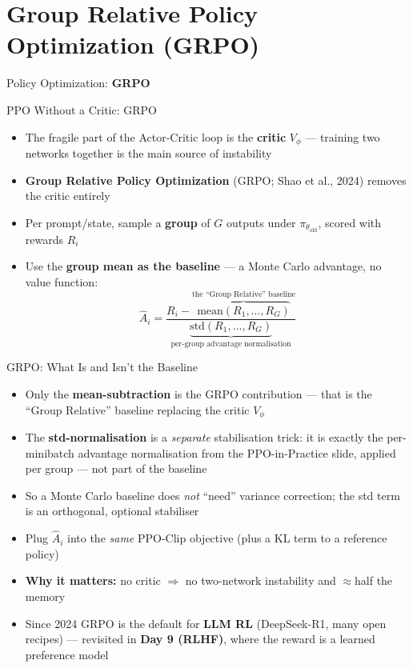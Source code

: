 \section{Group Relative Policy Optimization (GRPO)}
\begin{frame}{}
    \LARGE Policy Optimization: \textbf{GRPO}
\end{frame}

\begin{frame}{PPO Without a Critic: GRPO}
\begin{itemize}
    \item The fragile part of the Actor-Critic loop is the \textbf{critic} $V_\phi$ --- training two networks together is the main source of instability
    \item \textbf{Group Relative Policy Optimization} (GRPO; Shao et al., 2024) removes the critic entirely
    \pause
    \item Per prompt/state, sample a \textbf{group} of $G$ outputs under $\pi_{\theta_\text{old}}$, scored with rewards $R_i$
    \item Use the \textbf{group mean as the baseline} --- a Monte Carlo advantage, no value function:
    $$\hat{A}_i = \frac{R_i - \overbrace{\mathrm{mean}(R_1,\dots,R_G)}^{\text{the ``Group Relative'' baseline}}}{\underbrace{\mathrm{std}(R_1,\dots,R_G)}_{\text{per-group advantage normalisation}}}$$
\end{itemize}
\end{frame}

\begin{frame}{GRPO: What Is and Isn't the Baseline}
\begin{itemize}
    \item Only the \textbf{mean-subtraction} is the GRPO contribution --- that is the ``Group Relative'' baseline replacing the critic $V_\phi$
    \item The \textbf{std-normalisation} is a \emph{separate} stabilisation trick: it is exactly the per-minibatch advantage normalisation from the PPO-in-Practice slide, applied per group --- not part of the baseline
    \item So a Monte Carlo baseline does \emph{not} ``need'' variance correction; the std term is an orthogonal, optional stabiliser
    \pause
    \item Plug $\hat{A}_i$ into the \emph{same} PPO-Clip objective (plus a KL term to a reference policy)
    \item \textbf{Why it matters:} no critic $\Rightarrow$ no two-network instability and $\approx$half the memory
    \item Since 2024 GRPO is the default for \textbf{LLM RL} (DeepSeek-R1, many open recipes) --- revisited in \textbf{Day 9 (RLHF)}, where the reward is a learned preference model
\end{itemize}
\end{frame}
